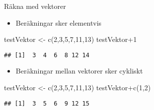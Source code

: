 \documentclass[
  10pt,
  ignorenonframetext,
]{beamer}
\newenvironment{Shaded}{\begin{snugshade}}{\end{snugshade}}
\newcommand{\DecValTok}[1]{\textcolor[rgb]{0.00,0.00,0.81}{#1}}
\newcommand{\FunctionTok}[1]{\textcolor[rgb]{0.00,0.00,0.00}{#1}}
\newcommand{\NormalTok}[1]{#1}
\newcommand{\OtherTok}[1]{\textcolor[rgb]{0.56,0.35,0.01}{#1}}
\newcommand{\SpecialCharTok}[1]{\textcolor[rgb]{0.00,0.00,0.00}{#1}}
\providecommand{\tightlist}{%
  \setlength{\itemsep}{0pt}\setlength{\parskip}{0pt}}
\begin{document}
\begin{frame}[fragile]{Räkna med vektorer}
\protect\hypertarget{ruxe4kna-med-vektorer}{}
\begin{itemize}
\tightlist
\item
  Beräkningar sker elementvis
\end{itemize}

\begin{Shaded}
\begin{Highlighting}[]
\NormalTok{testVektor }\OtherTok{\textless{}{-}} \FunctionTok{c}\NormalTok{(}\DecValTok{2}\NormalTok{,}\DecValTok{3}\NormalTok{,}\DecValTok{5}\NormalTok{,}\DecValTok{7}\NormalTok{,}\DecValTok{11}\NormalTok{,}\DecValTok{13}\NormalTok{)}
\NormalTok{testVektor}\SpecialCharTok{+}\DecValTok{1}
\end{Highlighting}
\end{Shaded}

\begin{verbatim}
## [1]  3  4  6  8 12 14
\end{verbatim}

\begin{itemize}
\tightlist
\item
  Beräkningar mellan vektorer sker cykliskt
\end{itemize}

\begin{Shaded}
\begin{Highlighting}[]
\NormalTok{testVektor }\OtherTok{\textless{}{-}} \FunctionTok{c}\NormalTok{(}\DecValTok{2}\NormalTok{,}\DecValTok{3}\NormalTok{,}\DecValTok{5}\NormalTok{,}\DecValTok{7}\NormalTok{,}\DecValTok{11}\NormalTok{,}\DecValTok{13}\NormalTok{)}
\NormalTok{testVektor}\SpecialCharTok{+}\FunctionTok{c}\NormalTok{(}\DecValTok{1}\NormalTok{,}\DecValTok{2}\NormalTok{)}
\end{Highlighting}
\end{Shaded}

\begin{verbatim}
## [1]  3  5  6  9 12 15
\end{verbatim}
\end{frame}
\end{document}
